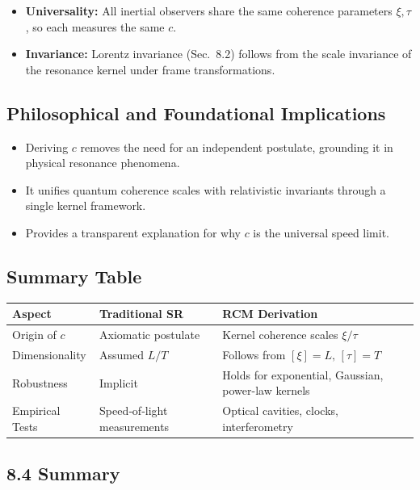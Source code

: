 \begin{itemize}
  \item \textbf{Universality:} All inertial observers share the same coherence parameters \(\xi,\tau\), so each measures the same \(c\).
  \item \textbf{Invariance:} Lorentz invariance (Sec.~8.2) follows from the scale invariance of the resonance kernel under frame transformations.
\end{itemize}

\subsection{Philosophical and Foundational Implications}

\begin{itemize}
  \item Deriving \(c\) removes the need for an independent postulate, grounding it in physical resonance phenomena.
  \item It unifies quantum coherence scales with relativistic invariants through a single kernel framework.
  \item Provides a transparent explanation for why \(c\) is the universal speed limit.
\end{itemize}

\subsection{Summary Table}

\begin{center}
\begin{tabular}{|l|l|l|}
\hline
Aspect & Traditional SR & RCM Derivation \\ \hline
Origin of \(c\) & Axiomatic postulate & Kernel coherence scales \(\xi/\tau\) \\ \hline
Dimensionality & Assumed \(L/T\) & Follows from \([\xi]=L,\,[\tau]=T\) \\ \hline
Robustness & Implicit & Holds for exponential, Gaussian, power-law kernels \\ \hline
Empirical Tests & Speed‐of‐light measurements & Optical cavities, clocks, interferometry \\ \hline
\end{tabular}
\end{center}

\subsection{8.4 Summary}

